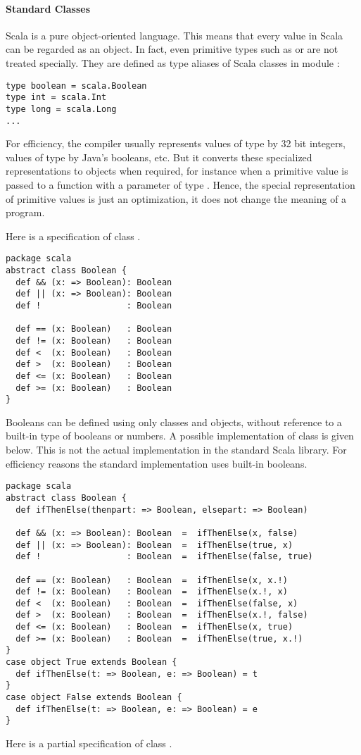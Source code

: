 \paragraph{Standard Classes}


Scala is a pure object-oriented language. This means that every value
in Scala can be regarded as an object.  In fact, even primitive types
such as  or  are not treated specially. They
are defined as type aliases of Scala classes in module :
\begin{lstlisting}
type boolean = scala.Boolean
type int = scala.Int
type long = scala.Long
...
\end{lstlisting}
For efficiency, the compiler usually represents values of type
 by 32 bit integers, values of type
 by Java's booleans, etc.  But it converts these
specialized representations to objects when required, for instance
when a primitive  value is passed to a function with a
parameter of type .  Hence, the special representation of
primitive values is just an optimization, it does not change the
meaning of a program.

Here is a specification of class .
\begin{lstlisting}
package scala
abstract class Boolean {
  def && (x: => Boolean): Boolean
  def || (x: => Boolean): Boolean
  def !                 : Boolean

  def == (x: Boolean)   : Boolean
  def != (x: Boolean)   : Boolean
  def <  (x: Boolean)   : Boolean
  def >  (x: Boolean)   : Boolean
  def <= (x: Boolean)   : Boolean
  def >= (x: Boolean)   : Boolean
}
\end{lstlisting}
Booleans can be defined using only classes and objects, without
reference to a built-in type of booleans or numbers. A possible
implementation of class  is given below.  This is not
the actual implementation in the standard Scala library. For
efficiency reasons the standard implementation uses built-in
booleans.
\begin{lstlisting}
package scala
abstract class Boolean {
  def ifThenElse(thenpart: => Boolean, elsepart: => Boolean)

  def && (x: => Boolean): Boolean  =  ifThenElse(x, false)
  def || (x: => Boolean): Boolean  =  ifThenElse(true, x)
  def !                 : Boolean  =  ifThenElse(false, true)

  def == (x: Boolean)   : Boolean  =  ifThenElse(x, x.!)
  def != (x: Boolean)   : Boolean  =  ifThenElse(x.!, x)
  def <  (x: Boolean)   : Boolean  =  ifThenElse(false, x)
  def >  (x: Boolean)   : Boolean  =  ifThenElse(x.!, false)
  def <= (x: Boolean)   : Boolean  =  ifThenElse(x, true)
  def >= (x: Boolean)   : Boolean  =  ifThenElse(true, x.!)
}
case object True extends Boolean {
  def ifThenElse(t: => Boolean, e: => Boolean) = t
}
case object False extends Boolean {
  def ifThenElse(t: => Boolean, e: => Boolean) = e
}
\end{lstlisting}
Here is a partial specification of class .

